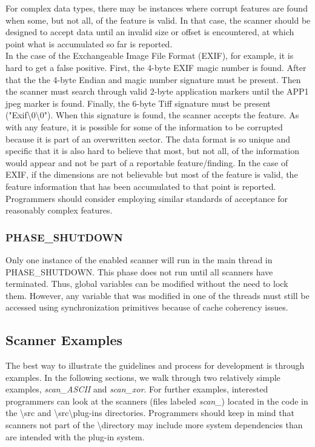 \documentclass[11pt,fleqn]{article} %
\begin{document}
For complex data types, there may be instances where corrupt features are found when some, but not all, of the feature is valid. In that case, the scanner should be designed to accept data until an invalid size or offset is encountered, at which point what is accumulated so far is reported. \\

In the case of the Exchangeable Image File Format (EXIF), for example, it is hard to get a false positive.  First, the 4-byte EXIF magic number is found. After that the the 4-byte Endian and magic number signature must be present.  Then the scanner must search through valid 2-byte application markers until the APP1 jpeg marker is found. Finally, the 6-byte Tiff signature must be present ("Exif\textbackslash 0\textbackslash 0"). When this signature is found, the scanner accepts the feature. As with any feature, it is possible for some of the information to be corrupted because it is part of an overwritten sector. The data format is so unique and specific that it is also hard to believe that most, but not all, of the information would appear and not be part of a reportable feature/finding. In the case of EXIF, if the dimensions are not believable but most of the feature is valid, the feature information that has been accumulated to that point is reported. Programmers should consider employing similar standards of acceptance for reasonably complex features.

\subsubsection{PHASE\_SHUTDOWN}
Only one instance of the enabled scanner will run in the main thread in PHASE\_SHUTDOWN. This phase does not run until all scanners have terminated. Thus, global variables can be modified without the need to lock them.  However, any variable that was modified in one of the threads must still be accessed using synchronization primitives because of cache coherency issues.\cite{programmerstex}

\subsection{Scanner Examples}
The best way to illustrate the guidelines and process for development is through examples. In the following sections, we walk through two relatively simple examples, \textit{scan\_ASCII} and \textit{scan\_xor}.  For further examples, interested programmers can look at the scanners (files labeled \textit{scan\_}) located  in the \bulk code in the \textbackslash src and \textbackslash src\textbackslash plug-ins directories. Programmers should keep in mind that scanners not part of the \textbackslash directory may include more \bulk system dependencies than are intended with the plug-in system.
\end{document}
